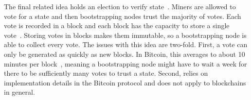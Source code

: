 
The final related idea holds an election to verify state~\cite{matzutt2020HowTSPrune}.
Miners are allowed to vote for a state and then bootstrapping nodes trust the majority of votes.
Each vote is recorded in a block and each block has the capacity to store a single vote~\cite{matzutt2020HowTSPrune}.
Storing votes in blocks makes them immutable, so a bootstrapping node is able to collect every vote.
The issues with this idea are two-fold.
First, a vote can only be generated as quickly as new blocks.
In Bitcoin, this averages to about 10 minutes per block~\cite{nakamoto2009Bitcoin}, meaning a bootstrapping node might have to wait a week for there to be sufficiently many votes to trust a state.
Second, \cite{matzutt2020HowTSPrune} relies on implementation details in the Bitcoin protocol and does not apply to blockchains in general.
